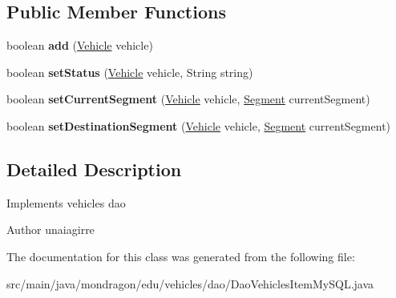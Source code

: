 \subsection*{Public Member Functions}
\begin{DoxyCompactItemize}
\item 
\mbox{\label{classmondragon_1_1edu_1_1vehicles_1_1dao_1_1_dao_vehicles_item_my_s_q_l_a670264032d2d199c79f6e34f595a0fe1}} 
boolean {\bfseries add} (\mbox{\hyperlink{classmondragon_1_1edu_1_1clases_1_1_vehicle}{Vehicle}} vehicle)
\item 
\mbox{\label{classmondragon_1_1edu_1_1vehicles_1_1dao_1_1_dao_vehicles_item_my_s_q_l_a9f30b2ef47b5a8bda06ca07a2e4bfab7}} 
boolean {\bfseries set\+Status} (\mbox{\hyperlink{classmondragon_1_1edu_1_1clases_1_1_vehicle}{Vehicle}} vehicle, String string)
\item 
\mbox{\label{classmondragon_1_1edu_1_1vehicles_1_1dao_1_1_dao_vehicles_item_my_s_q_l_ae5a1ce966146038618f22b68b84eb8d2}} 
boolean {\bfseries set\+Current\+Segment} (\mbox{\hyperlink{classmondragon_1_1edu_1_1clases_1_1_vehicle}{Vehicle}} vehicle, \mbox{\hyperlink{classmondragon_1_1edu_1_1clases_1_1_segment}{Segment}} current\+Segment)
\item 
\mbox{\label{classmondragon_1_1edu_1_1vehicles_1_1dao_1_1_dao_vehicles_item_my_s_q_l_a16fa85a8ffed4b7619b9ef8c0a42b6a7}} 
boolean {\bfseries set\+Destination\+Segment} (\mbox{\hyperlink{classmondragon_1_1edu_1_1clases_1_1_vehicle}{Vehicle}} vehicle, \mbox{\hyperlink{classmondragon_1_1edu_1_1clases_1_1_segment}{Segment}} current\+Segment)
\end{DoxyCompactItemize}


\subsection{Detailed Description}
Implements vehicles dao

\begin{DoxyAuthor}{Author}
unaiagirre 
\end{DoxyAuthor}


The documentation for this class was generated from the following file\+:\begin{DoxyCompactItemize}
\item 
src/main/java/mondragon/edu/vehicles/dao/Dao\+Vehicles\+Item\+My\+S\+Q\+L.\+java\end{DoxyCompactItemize}
